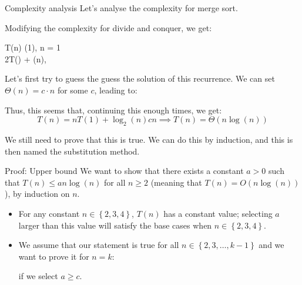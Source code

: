 \documentclass[a4paper]{article}
\begin{document}
\begin{parag}{Complexity analysis}
    Let's analyse the complexity for merge sort. 

    Modifying the complexity for divide and conquer, we get:
    \begin{functionbypart}{T\left(n\right)}
        \Theta\left(1\right), \mathspace {} n = 1\\
        2T\left(\right) + \Theta\left(n\right), \mathspace {}
    \end{functionbypart}

    Let's first try to guess the guess the solution of this recurrence. We can set $\Theta\left(n\right) = c\cdot n$ for some $c$, leading to:

    Thus, this seems that, continuing this enough times, we get:
    \[T\left(n\right) = n T\left(1\right) + \log_2\left(n\right) c n \implies T\left(n\right) = \Theta\left(n \log\left(n\right)\right)\]

    We still need to prove that this is true. We can do this by induction, and this is then named the substitution method.

    \begin{subparag}{Proof: Upper bound}
        We want to show that there exists a constant $a > 0$ such that $T\left(n\right) \leq an\log\left(n\right)$ for all $n \geq 2$ (meaning that $T\left(n\right) = O\left(n \log\left(n\right)\right)$), by induction on $n$.

        \begin{itemize}[left=0pt]
            \item For any constant $n \in \left\{2, 3, 4\right\}$, $T\left(n\right)$ has a constant value; selecting $a$ larger than this value will satisfy the base cases when $n \in \left\{2, 3, 4\right\}$.
            \item We assume that our statement is true for all $n \in \left\{2, 3, \ldots, k-1\right\}$ and we want to prove it for $n = k$: 
            
            if we select $a \geq c$.
        \end{itemize}


\end{subparag}
\end{parag}
\end{document}

